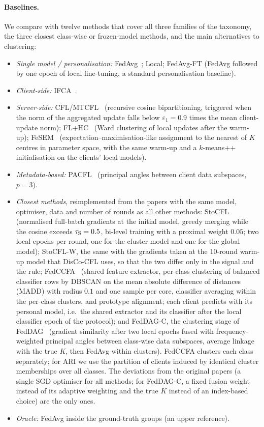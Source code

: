\paragraph{Baselines.} We compare with twelve methods that cover all three families of the taxonomy, the three closest class-wise or frozen-model methods, and the main alternatives to clustering:
\begin{itemize}[leftmargin=*,itemsep=1pt]
\item \emph{Single model / personalisation:} FedAvg~\citep{mcmahan2017fedavg}; Local; FedAvg-FT (FedAvg followed by one epoch of local fine-tuning, a standard personalisation baseline).
\item \emph{Client-side:} IFCA~\citep{ghosh2020ifca}.
\item \emph{Server-side:} CFL/MTCFL~\citep{sattler2021cfl} (recursive cosine bipartitioning, triggered when the norm of the aggregated update falls below $\varepsilon_1=0.9$ times the mean client-update norm); FL+HC~\citep{briggs2020flhc} (Ward clustering of local updates after the warm-up); FeSEM~\citep{long2023fesem} (expectation--maximisation-like assignment to the nearest of $K$ centres in parameter space, with the same warm-up and a $k$-means++ initialisation on the clients' local models).
\item \emph{Metadata-based:} PACFL~\citep{vahidian2023pacfl} (principal angles between client data subspaces, $p=3$).
\item \emph{Closest methods}, reimplemented from the papers with the same model, optimiser, data and number of rounds as all other methods: StoCFL~\citep{zeng2025stocfl} (normalised full-batch gradients at the initial model, greedy merging while the cosine exceeds $\tau_{\rm S}=0.5$, bi-level training with a proximal weight $0.05$; two local epochs per round, one for the cluster model and one for the global model); StoCFL-W, the same with the gradients taken at the 10-round warm-up model that DisCo-CFL uses, so that the two differ only in the signal and the rule; FedCCFA~\citep{chen2024fedccfa} (shared feature extractor, per-class clustering of balanced classifier rows by DBSCAN on the mean absolute difference of distances (MADD) with radius $0.1$ and one sample per core, classifier averaging within the per-class clusters, and prototype alignment; each client predicts with its personal model, i.e.\ the shared extractor and its classifier after the local classifier epoch of the protocol); and FedDAG-C, the clustering stage of FedDAG~\citep{pramanik2026feddag} (gradient similarity after two local epochs fused with frequency-weighted principal angles between class-wise data subspaces, average linkage with the true $K$, then FedAvg within clusters). FedCCFA clusters each class separately; for ARI we use the partition of clients induced by identical cluster memberships over all classes. The deviations from the original papers (a single SGD optimiser for all methods; for FedDAG-C, a fixed fusion weight instead of its adaptive weighting and the true $K$ instead of an index-based choice) are the only ones.
\item \emph{Oracle:} FedAvg inside the ground-truth groups (an upper reference).
\end{itemize}

